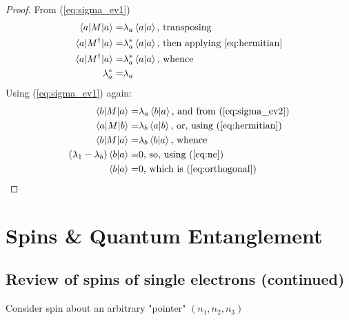 \documentclass[]{article}
\begin{document}
\begin{proof}
	From (\ref{eq:sigma_ev1})
	\begin{align*}
		\braket{a \vert M \vert a} =& \lambda_a \braket{a\vert a} \text{, transposing}\\
		\braket{a \vert M^\dagger \vert a} =& \lambda_a^* \braket{a\vert a} \text{, then applying \eqref{eq:hermitian}} \\
		\braket{a \vert M^\dagger \vert a} =& \lambda_a^* \braket{a\vert a} \text{, whence}\\
		\lambda_a^* =& \lambda_a
	\end{align*}
	Using  (\ref{eq:sigma_ev1}) again:
	\begin{align*}
		\braket{b \vert M \vert a} =& \lambda_a \braket{b\vert a} \text{, and from (\ref{eq:sigma_ev2})}\\
		\braket{a \vert M \vert b} =& \lambda_b \braket{a\vert b} \text{, or, using (\ref{eq:hermitian})}\\
		\braket{b \vert M \vert a} =& \lambda_b \braket{b\vert a} \text{, whence}\\
		(\lambda_1-\lambda_b)\braket{b\vert a} =& 0 \text{, so, using (\ref{eq:ne})}\\
		\braket{b\vert a} =& 0\text{, which is (\ref{eq:orthogonal})}
	\end{align*}
\end{proof}

\section{Spins \& Quantum Entanglement}

\subsection{Review of spins of single electrons (continued)}

Consider spin about an arbitrary "pointer" $(n_1,n_2,n_3)$
\end{document}
